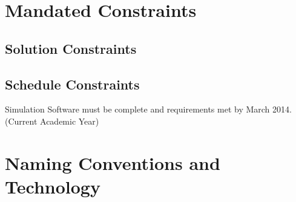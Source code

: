 \documentclass[paper=letter, fontsize=10pt]{scrartcl}
\numberwithin{equation}{section}		%
\numberwithin{figure}{section}			%
\numberwithin{table}{section}				%
\begin{document}
\section{Mandated Constraints}
\subsection{Solution Constraints}

\subsection{Schedule Constraints}
Simulation Software must be complete and requirements met by March 2014. (Current Academic Year)  


\section{Naming Conventions and Technology}
\end{document}
